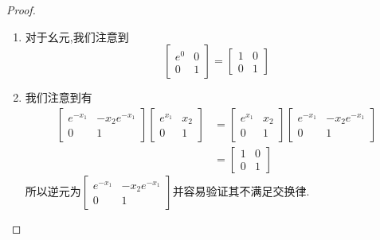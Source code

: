 \begin{proof}
\begin{enumerate}
        \item 对于幺元,我们注意到
        \begin{equation}
            \begin{bmatrix}e^0&0\\0&1\end{bmatrix}=\begin{bmatrix}1&0\\0&1\end{bmatrix}
        \end{equation}
        \item 我们注意到有
        \begin{equation}
            \begin{aligned}\begin{bmatrix}e^{-x_1}&-x_2e^{-x_1}\\0&1\end{bmatrix}\begin{bmatrix}e^{x_1}&x_2\\0&1\end{bmatrix}&=\begin{bmatrix}e^{x_1}&x_2\\0&1\end{bmatrix}\begin{bmatrix}e^{-x_1}&-x_2e^{-x_1}\\0&1\end{bmatrix}\\&=\begin{bmatrix}1&0\\0&1\end{bmatrix}\end{aligned}
        \end{equation}
        所以逆元为$\begin{bmatrix}e^{-x_1}&-x_2e^{-x_1}\\0&1\end{bmatrix}$并容易验证其不满足交换律.
    \end{enumerate}
\end{proof}
